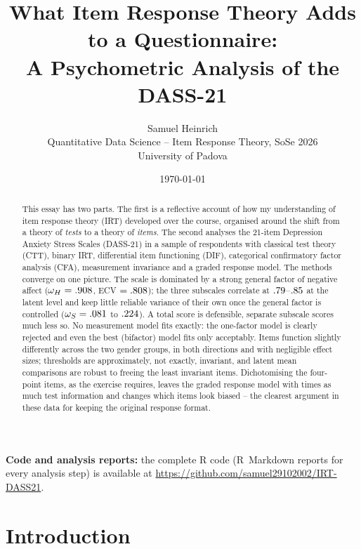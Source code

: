 \documentclass[11pt,a4paper]{article}
\title{\vspace{-1.5cm}\textbf{What Item Response Theory Adds to a Questionnaire:\\
A Psychometric Analysis of the DASS-21}}
\author{Samuel Heinrich\\[2pt]
\small Quantitative Data Science -- Item Response Theory, SoSe 2026\\
\small University of Padova}
\date{\today}
\newcommand{\CodeURL}{\url{https://github.com/samuel29102002/IRT-DASS21}}
\begin{document}
\maketitle
\thispagestyle{empty}

\begin{abstract}
\noindent
This essay has two parts. The first is a reflective account of how my understanding
of item response theory (IRT) developed over the course, organised around the
shift from a theory of \emph{tests} to a theory of \emph{items}. The second analyses
the 21-item Depression Anxiety Stress Scales (DASS-21) in a sample of \NTotal{}
respondents with classical test theory (CTT), binary IRT, differential item
functioning (DIF), categorical confirmatory factor analysis (CFA), measurement
invariance and a graded response model. The methods converge on one picture. The
scale is dominated by a strong general factor of negative affect
($\omega_H = .908$, ECV $= .808$); the three subscales correlate at
$.79$--$.85$ at the latent level and keep little reliable variance of their own
once the general factor is controlled ($\omega_S = .081$ to
$.224$). A total score is defensible, separate subscale scores much less
so. No measurement model fits exactly: the one-factor model is clearly rejected and
even the best (bifactor) model fits only acceptably. Items function slightly
differently across the two gender groups, in both directions and with negligible
effect sizes; thresholds are approximately, not exactly, invariant, and latent mean
comparisons are robust to freeing the least invariant items. Dichotomising the
four-point items, as the exercise requires, leaves the graded response model with
\InfoRatioA{} times as much test information and changes which items look
biased -- the clearest argument in these data for keeping the original response
format.
\end{abstract}

\noindent\textbf{Code and analysis reports:} the complete R code (R~Markdown reports for
every analysis step) is available at \CodeURL.


\vspace{4pt}
{\small\tableofcontents}
\newpage

\section{Introduction}
\end{document}
